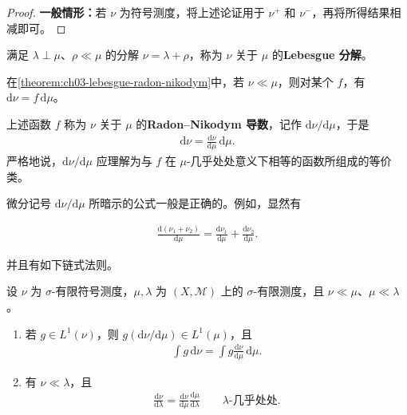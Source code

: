 \documentclass[../../main.tex]{subfiles}%
\begin{document}
\begin{proof}
\textbf{一般情形：}若 $\nu$ 为符号测度，将上述论证用于 $\nu^+$ 和 $\nu^-$，再将所得结果相减即可。
\end{proof}
\begin{definition}[Lebesgue 分解]\label{definition:ch03-lebesgue-decomposition}
满足 $\lambda\perp\mu$、$\rho\ll\mu$ 的分解 $\nu=\lambda+\rho$，称为 $\nu$ 关于 $\mu$ 的\textbf{Lebesgue 分解}。
\end{definition}
\begin{corollary}\label{corollary:ch03-radon-nikodym}
在\cref{theorem:ch03-lebesgue-radon-nikodym}中，若 $\nu\ll\mu$，则对某个 $f$，有 $\mathrm{d}\nu=f\,\mathrm{d}\mu$。
\end{corollary}
\begin{definition}\label{definition:ch03-radon-nikodym-derivative}
上述函数 $f$ 称为 $\nu$ 关于 $\mu$ 的\textbf{Radon–Nikodym 导数}，记作 $\mathrm{d}\nu/\mathrm{d}\mu$，于是
\begin{align*}
\mathrm{d}\nu=\frac{\mathrm{d}\nu}{\mathrm{d}\mu}\,\mathrm{d}\mu.
\end{align*}
严格地说，$\mathrm{d}\nu/\mathrm{d}\mu$ 应理解为与 $f$ 在 $\mu$-几乎处处意义下相等的函数所组成的等价类。
\end{definition}
微分记号 $\mathrm{d}\nu/\mathrm{d}\mu$ 所暗示的公式一般是正确的。例如，显然有
\begin{proposition}\label{proposition:ch03-radon-nikodym-linearity}
\begin{align*}
\frac{\mathrm{d}(\nu_1+\nu_2)}{\mathrm{d}\mu}=\frac{\mathrm{d}\nu_1}{\mathrm{d}\mu}+\frac{\mathrm{d}\nu_2}{\mathrm{d}\mu}.
\end{align*}
\end{proposition}
并且有如下链式法则。
\begin{proposition}\label{proposition:ch03-radon-nikodym-chain}
设 $\nu$ 为 $\sigma$-有限符号测度，$\mu,\lambda$ 为 $(X,\mathscr{M})$ 上的 $\sigma$-有限测度，且 $\nu\ll\mu$、$\mu\ll\lambda$。
\begin{enumerate}
\item\label{item:ch03-radon-nikodym-integration} 若 $g\in L^1(\nu)$，则 $g(\mathrm{d}\nu/\mathrm{d}\mu)\in L^1(\mu)$，且
\begin{align*}
\int g\,\mathrm{d}\nu=\int g\frac{\mathrm{d}\nu}{\mathrm{d}\mu}\,\mathrm{d}\mu.
\end{align*}
\item\label{item:ch03-radon-nikodym-chain} 有 $\nu\ll\lambda$，且
\begin{align*}
\frac{\mathrm{d}\nu}{\mathrm{d}\lambda}=\frac{\mathrm{d}\nu}{\mathrm{d}\mu}\frac{\mathrm{d}\mu}{\mathrm{d}\lambda}\qquad\lambda\text{-几乎处处}.
\end{align*}
\end{enumerate}
\end{proposition}
\end{document}
